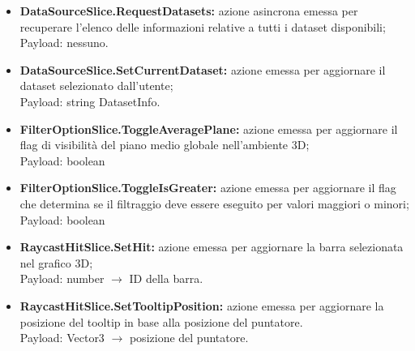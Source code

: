 \begin{itemize}
        \item \textbf{DataSourceSlice.RequestDatasets:} azione asincrona emessa per recuperare l'elenco delle informazioni relative a tutti i dataset disponibili; \\ Payload: nessuno.
        \item \textbf{DataSourceSlice.SetCurrentDataset:} azione emessa per aggiornare il dataset selezionato dall'utente; \\ Payload: string DatasetInfo.
        \item \textbf{FilterOptionSlice.ToggleAveragePlane:} azione emessa per aggiornare il flag di visibilità del piano medio globale nell'ambiente 3D; \\ Payload: boolean 
        \item \textbf{FilterOptionSlice.ToggleIsGreater:} azione emessa per aggiornare il flag che determina se il filtraggio deve essere eseguito per valori maggiori o minori; \\ Payload: boolean
        \item \textbf{RaycastHitSlice.SetHit:} azione emessa per aggiornare la barra selezionata nel grafico 3D; \\ Payload: number $\rightarrow$ ID della barra.
        \item \textbf{RaycastHitSlice.SetTooltipPosition:} azione emessa per aggiornare la posizione del tooltip in base alla posizione del puntatore.\\ Payload: Vector3 $\rightarrow$ posizione del puntatore.
    \end{itemize}

